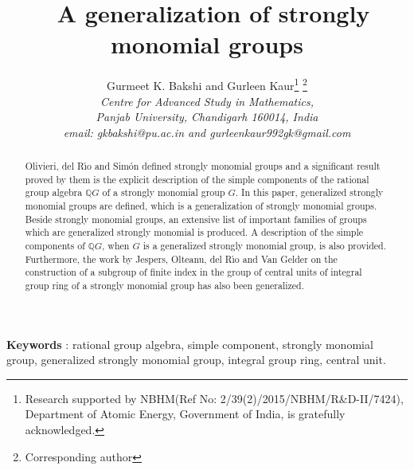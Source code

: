 \documentclass[12pt,a4paper]{article}
\begin{document}
\baselineskip 18pt \title{\bf \ A generalization of strongly monomial groups}
\author{ Gurmeet K. Bakshi and Gurleen Kaur{\footnote {Research supported by NBHM(Ref No: 2/39(2)/2015/NBHM/R\&D-II/7424), Department of Atomic Energy, Government of India, is gratefully acknowledged.} \footnote{Corresponding author}} \\ {\em \small Centre for Advanced Study in
Mathematics,}\\
{\em \small Panjab University, Chandigarh 160014, India}\\{\em
\small email: gkbakshi@pu.ac.in and gurleenkaur992gk@gmail.com  } }
\date{}
{\maketitle}
\begin{abstract}  Olivieri, del R{\'{\i}}o and Sim{\'o}n defined strongly monomial groups and a significant result proved by them is the explicit description of the simple components of the rational group algebra $\mathbb{Q}G$ of a strongly monomial group $G$. In this paper, generalized strongly monomial groups are defined, which is a generalization of strongly monomial groups. Beside strongly monomial groups, an extensive list of important families of groups which are generalized strongly monomial is produced. A description of the simple components of $\mathbb{Q}G$, when $G$ is a generalized strongly monomial group, is also provided. Furthermore, the work by Jespers, Olteanu, del R{\'{\i}}o and Van Gelder on the construction of a subgroup of finite index in the group of central units of integral group ring of a strongly monomial group has also been generalized.\end{abstract}
{\bf Keywords} : rational group algebra, simple component, strongly monomial group, generalized strongly monomial group, integral group ring, central unit. \vspace{.25cm} \\
\end{document}
